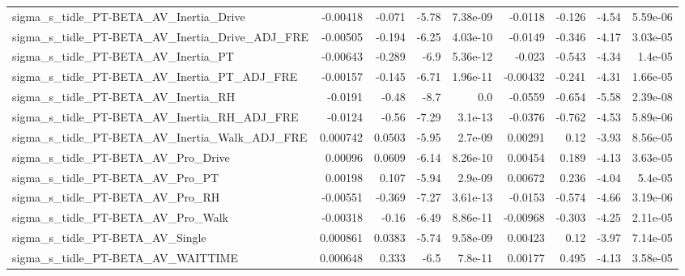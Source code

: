 \begin{tabular}{lrrrrrrrr}
sigma\_s\_tidle\_PT-BETA\_AV\_Inertia\_Drive             &    -0.00418 &       -0.071 &    -5.78 & 7.38e-09 &    -0.0118 &      -0.126 &        -4.54 &      5.59e-06 \\
sigma\_s\_tidle\_PT-BETA\_AV\_Inertia\_Drive\_ADJ\_FRE     &    -0.00505 &       -0.194 &    -6.25 & 4.03e-10 &    -0.0149 &      -0.346 &        -4.17 &      3.03e-05 \\
sigma\_s\_tidle\_PT-BETA\_AV\_Inertia\_PT                &    -0.00643 &       -0.289 &     -6.9 & 5.36e-12 &     -0.023 &      -0.543 &        -4.34 &       1.4e-05 \\
sigma\_s\_tidle\_PT-BETA\_AV\_Inertia\_PT\_ADJ\_FRE        &    -0.00157 &       -0.145 &    -6.71 & 1.96e-11 &   -0.00432 &      -0.241 &        -4.31 &      1.66e-05 \\
sigma\_s\_tidle\_PT-BETA\_AV\_Inertia\_RH                &     -0.0191 &        -0.48 &     -8.7 &      0.0 &    -0.0559 &      -0.654 &        -5.58 &      2.39e-08 \\
sigma\_s\_tidle\_PT-BETA\_AV\_Inertia\_RH\_ADJ\_FRE        &     -0.0124 &        -0.56 &    -7.29 &  3.1e-13 &    -0.0376 &      -0.762 &        -4.53 &      5.89e-06 \\
sigma\_s\_tidle\_PT-BETA\_AV\_Inertia\_Walk\_ADJ\_FRE      &    0.000742 &       0.0503 &    -5.95 &  2.7e-09 &    0.00291 &        0.12 &        -3.93 &      8.56e-05 \\
sigma\_s\_tidle\_PT-BETA\_AV\_Pro\_Drive                 &     0.00096 &       0.0609 &    -6.14 & 8.26e-10 &    0.00454 &       0.189 &        -4.13 &      3.63e-05 \\
sigma\_s\_tidle\_PT-BETA\_AV\_Pro\_PT                    &     0.00198 &        0.107 &    -5.94 &  2.9e-09 &    0.00672 &       0.236 &        -4.04 &       5.4e-05 \\
sigma\_s\_tidle\_PT-BETA\_AV\_Pro\_RH                    &    -0.00551 &       -0.369 &    -7.27 & 3.61e-13 &    -0.0153 &      -0.574 &        -4.66 &      3.19e-06 \\
sigma\_s\_tidle\_PT-BETA\_AV\_Pro\_Walk                  &    -0.00318 &        -0.16 &    -6.49 & 8.86e-11 &   -0.00968 &      -0.303 &        -4.25 &      2.11e-05 \\
sigma\_s\_tidle\_PT-BETA\_AV\_Single                    &    0.000861 &       0.0383 &    -5.74 & 9.58e-09 &    0.00423 &        0.12 &        -3.97 &      7.14e-05 \\
sigma\_s\_tidle\_PT-BETA\_AV\_WAITTIME                  &    0.000648 &        0.333 &     -6.5 &  7.8e-11 &    0.00177 &       0.495 &        -4.13 &      3.58e-05 \\

\end{tabular}
